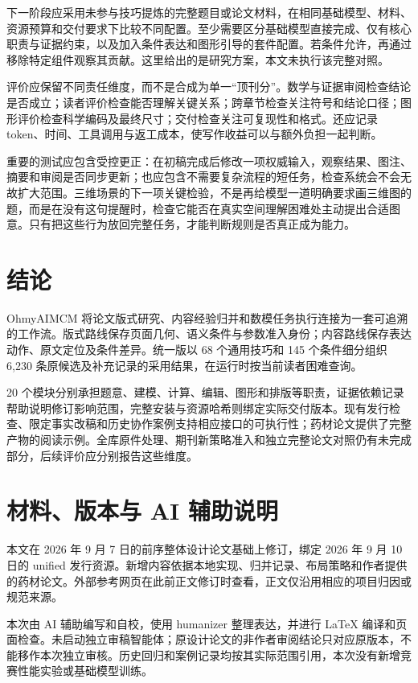 \documentclass[UTF8,a4paper,zihao=-4,fontset=fandol]{ctexart}
\newcommand{\sys}{\textsf{OhmyAIMCM}}
\begin{document}
下一阶段应采用未参与技巧提炼的完整题目或论文材料，在相同基础模型、材料、资源预算和交付要求下比较不同配置。至少需要区分基础模型直接完成、仅有核心职责与证据约束，以及加入条件表达和图形引导的套件配置。若条件允许，再通过移除特定组件观察其贡献。这里给出的是研究方案，本文未执行该完整对照。

评价应保留不同责任维度，而不是合成为单一“顶刊分”。数学与证据审阅检查结论是否成立；读者评价检查能否理解关键关系；跨章节检查关注符号和结论口径；图形评价检查科学编码及最终尺寸；交付检查关注可复现性和格式。还应记录 token、时间、工具调用与返工成本，使写作收益可以与额外负担一起判断。

重要的测试应包含受控更正：在初稿完成后修改一项权威输入，观察结果、图注、摘要和审阅是否同步更新；也应包含不需要复杂流程的短任务，检查系统会不会无故扩大范围。三维场景的下一项关键检验，不是再给模型一道明确要求画三维图的题，而是在没有这句提醒时，检查它能否在真实空间理解困难处主动提出合适图意。只有把这些行为放回完整任务，才能判断规则是否真正成为能力。

\section{结论}

\sys{} 将论文版式研究、内容经验归并和数模任务执行连接为一套可追溯的工作流。版式路线保存页面几何、语义条件与参数准入身份；内容路线保存表达动作、原文定位及条件差异。统一版以 68 个通用技巧和 145 个条件细分组织 6,230 条原候选及补充记录的采用结果，在运行时按当前读者困难查询。

20 个模块分别承担题意、建模、计算、编辑、图形和排版等职责，证据依赖记录帮助说明修订影响范围，完整安装与资源哈希则绑定实际交付版本。现有发行检查、限定事实改稿和历史协作案例支持相应接口的可执行性；药材论文提供了完整产物的阅读示例。全库原件处理、期刊新策略准入和独立完整论文对照仍有未完成部分，后续评价应分别报告这些维度。

\section*{材料、版本与 AI 辅助说明}

本文在 2026 年 9 月 7 日的前序整体设计论文基础上修订，绑定 2026 年 9 月 10 日的 unified 发行资源。新增内容依据本地实现、归并记录、布局策略和作者提供的药材论文。外部参考网页在此前正文修订时查看，正文仅沿用相应的项目归因或规范来源。

本次由 AI 辅助编写和自校，使用 humanizer 整理表达，并进行 LaTeX 编译和页面检查。未启动独立审稿智能体；原设计论文的非作者审阅结论只对应原版本，不能移作本次独立审核。历史回归和案例记录均按其实际范围引用，本次没有新增竞赛性能实验或基础模型训练。
\end{document}
